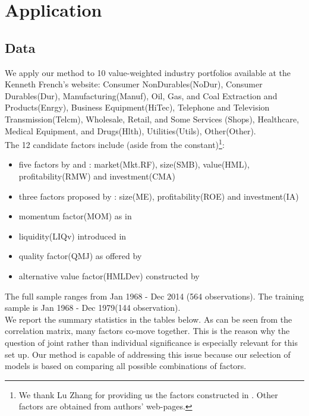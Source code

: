 \section{Application}
\subsection{Data}
We apply our method to 10 value-weighted industry portfolios available at the Kenneth French's website: Consumer NonDurables(NoDur), Consumer Durables(Dur), Manufacturing(Manuf),  Oil, Gas, and Coal Extraction and Products(Enrgy), Business Equipment(HiTec),   Telephone and Television Transmission(Telcm),   Wholesale, Retail, and Some Services (Shops),
Healthcare, Medical Equipment, and Drugs(Hlth),
Utilities(Utils), Other(Other). \\
The 12 candidate factors include (aside from the constant)\footnote{We thank Lu Zhang for providing us the factors constructed in \cite{hou2014digesting}. Other factors are obtained from authors' web-pages.}:
\begin{itemize}
	\item five factors by \cite{fama1993common} and \cite{fama2015five}: market(Mkt.RF), size(SMB), value(HML), profitability(RMW) and investment(CMA)
	\item three factors proposed by \cite{hou2014digesting}: size(ME), profitability(ROE) and investment(IA)
	\item momentum factor(MOM) as in \cite{carhart1997persistence}
	\item liquidity(LIQv) introduced in \cite{stambaugh2003liquidity}
	\item quality factor(QMJ) as offered by \cite{asness2014quality}
	\item alternative value factor(HMLDev) constructed by \cite{asness2013devil}
\end{itemize}

The full sample ranges from Jan 1968 - Dec 2014 (564 observations). The training sample is Jan 1968 - Dec 1979(144 observation). \\
We report the summary statistics in the tables below. As can be seen from the correlation matrix, many factors co-move together. This is the reason why the question of joint rather than individual significance is especially relevant for this set up. Our method is capable of addressing this issue because our selection of models is based on comparing all possible combinations of factors.

